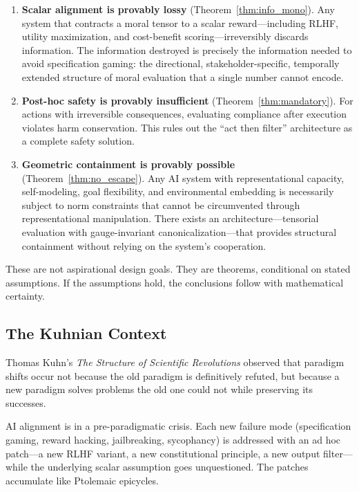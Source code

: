 \documentclass[12pt]{article}
\theoremstyle{definition}
\theoremstyle{remark}
\begin{document}
\begin{enumerate}
    \item \textbf{Scalar alignment is provably lossy} (Theorem~\ref{thm:info_mono}). Any system that contracts a moral tensor to a scalar reward---including RLHF, utility maximization, and cost-benefit scoring---irreversibly discards information. The information destroyed is precisely the information needed to avoid specification gaming: the directional, stakeholder-specific, temporally extended structure of moral evaluation that a single number cannot encode.
    \item \textbf{Post-hoc safety is provably insufficient} (Theorem~\ref{thm:mandatory}). For actions with irreversible consequences, evaluating compliance after execution violates harm conservation. This rules out the ``act then filter'' architecture as a complete safety solution.
    \item \textbf{Geometric containment is provably possible} (Theorem~\ref{thm:no_escape}). Any AI system with representational capacity, self-modeling, goal flexibility, and environmental embedding is necessarily subject to norm constraints that cannot be circumvented through representational manipulation. There exists an architecture---tensorial evaluation with gauge-invariant canonicalization---that provides structural containment without relying on the system's cooperation.
\end{enumerate}

These are not aspirational design goals. They are theorems, conditional on stated assumptions. If the assumptions hold, the conclusions follow with mathematical certainty.

\subsection{The Kuhnian Context}

Thomas Kuhn's \emph{The Structure of Scientific Revolutions} \citep{kuhn1962} observed that paradigm shifts occur not because the old paradigm is definitively refuted, but because a new paradigm solves problems the old one could not while preserving its successes.

AI alignment is in a pre-paradigmatic crisis. Each new failure mode (specification gaming, reward hacking, jailbreaking, sycophancy) is addressed with an ad hoc patch---a new RLHF variant, a new constitutional principle, a new output filter---while the underlying scalar assumption goes unquestioned. The patches accumulate like Ptolemaic epicycles.
\end{document}
